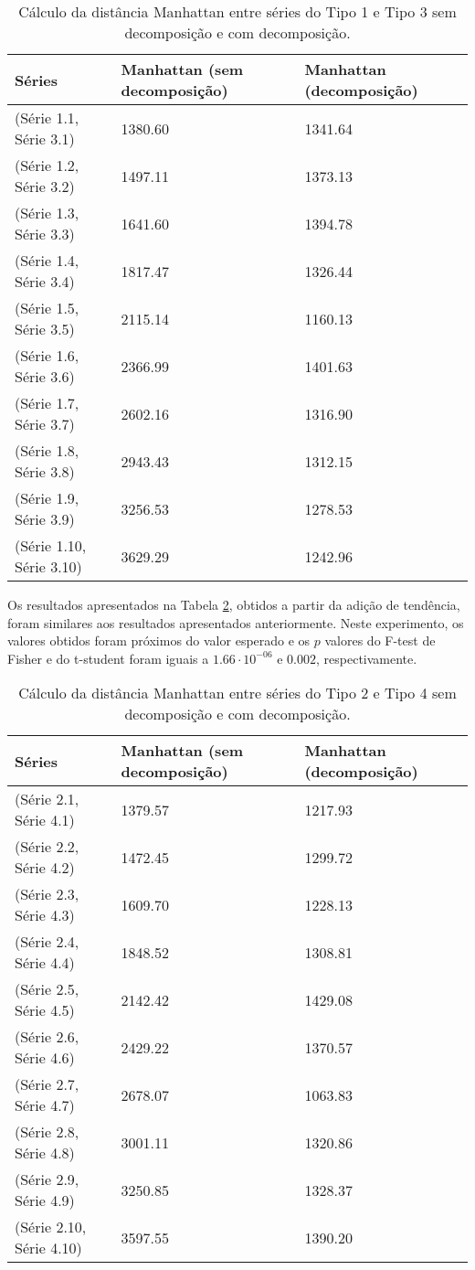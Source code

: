 \begin{table}[!ht]
\centering
\caption{Cálculo da distância Manhattan entre séries do Tipo 1 e Tipo 3 sem decomposição e com decomposição.}
\begin{tabular}{lll}
  \hline
Séries & Manhattan (sem decomposição) & Manhattan (decomposição) \\
  \hline
(Série 1.1, Série 3.1) & 1380.60 & 1341.64\\
(Série 1.2, Série 3.2) & 1497.11 & 1373.13\\ 
(Série 1.3, Série 3.3) &  1641.60 & 1394.78 \\ 
(Série 1.4, Série 3.4) & 1817.47 & 1326.44\\
(Série 1.5, Série 3.5) & 2115.14 & 1160.13\\
(Série 1.6, Série 3.6) & 2366.99 & 1401.63\\
(Série 1.7, Série 3.7) & 2602.16 & 1316.90\\ 
(Série 1.8, Série 3.8) & 2943.43 & 1312.15\\ 
(Série 1.9, Série 3.9) & 3256.53 & 1278.53\\ 
(Série 1.10, Série 3.10) &  3629.29 & 1242.96\\ 
   \hline
\end{tabular}
\label{manhattan}
\end{table}

Os resultados apresentados na Tabela \ref{manhattan2}, obtidos a partir da adição de tendência, foram similares aos resultados apresentados anteriormente. Neste experimento, os valores obtidos foram próximos do valor esperado e os $p$ valores do F-test de Fisher e do t-student foram iguais a $1.66 \cdot 10^{-06}$ e $0.002$, respectivamente.

\begin{table}[!ht]
\centering
\caption{Cálculo da distância Manhattan entre séries do Tipo 2 e Tipo 4 sem decomposição e com decomposição.}
\begin{tabular}{lll}
 \hline
Séries & Manhattan (sem decomposição) & Manhattan (decomposição) \\
 \hline
(Série 2.1, Série 4.1) & 1379.57 & 1217.93 \\ 
(Série 2.2, Série 4.2) & 1472.45 & 1299.72 \\
(Série 2.3, Série 4.3) & 1609.70 & 1228.13 \\ 
(Série 2.4, Série 4.4) & 1848.52 & 1308.81 \\ 
(Série 2.5, Série 4.5) &  2142.42 & 1429.08 \\ 
(Série 2.6, Série 4.6) & 2429.22 & 1370.57 \\
(Série 2.7, Série 4.7) & 2678.07 & 1063.83 \\
(Série 2.8, Série 4.8) & 3001.11 & 1320.86 \\ 
(Série 2.9, Série 4.9) & 3250.85 & 1328.37 \\ 
(Série 2.10, Série 4.10) & 3597.55 & 1390.20 \\
  \hline
\end{tabular}
\label{manhattan2}
\end{table}

